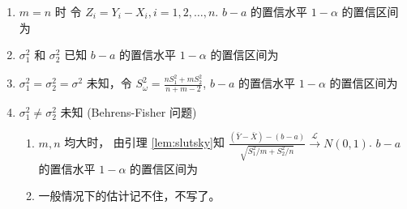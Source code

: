 \begin{proposition}\label{prop:均值差$b-a$的置信区间}
    \begin{enumerate}
    \item $m=n$ 时
    令 $Z_i = Y_i - X_i, i = 1,2, \dots, n$. 
    $b-a$ 的置信水平 $1-\alpha$ 的置信区间为 
    \begin{equation}
        [\bar{Z} - \frac{S_Z}{\sqrt{n}} t_{n-1}(\alpha/2), \bar{Z} + \frac{S_Z}{\sqrt{n}} t_{n-1}(\alpha/2)]
    \end{equation}

    \item $\sigma_1^2$ 和 $\sigma_2^2$ 已知
    $b-a$ 的置信水平 $1-\alpha$ 的置信区间为
    \begin{equation}
        [\bar{X}-\bar{Y} - \sqrt{\sigma_1^2/n + \sigma_2^2/m} u_{\alpha/2}, \bar{X}-\bar{Y} + \sqrt{\sigma_1^2/n + \sigma_2^2/m} u_{\alpha/2}]
    \end{equation}

    \item $\sigma_1^2 = \sigma_2^2 = \sigma^2$ 未知，令 $S_{\omega}^2 = \frac{nS_1^2 + mS_2^2}{n+m-2}$, 
    $b-a$ 的置信水平 $1-\alpha$ 的置信区间为
    \begin{equation}
        [\bar{Y}-\bar{X} - S_{\omega}\sqrt{1/n+1/m} t_{n+m-2}(\alpha/2), \bar{Y}-\bar{X} + S_{\omega}\sqrt{1/n+1/m} t_{n+m-2}(\alpha/2)]
    \end{equation}

    \item $\sigma_1^2 \ne \sigma_2^2$ 未知 (Behrens-Fisher 问题)
    \begin{enumerate}
        \item $m,n$ 均大时，
    由引理 \ref{lem:slutsky}知
    $\frac{(\bar{Y}-\bar{X})-(b-a)}{\sqrt{S_1^2/m + S_2^2/n}} \xrightarrow{\mathscr{L}} N(0,1)$.
    $b-a$ 的置信水平 $1-\alpha$ 的置信区间为
    \begin{equation}
        [\bar{X}-\bar{Y} - \sqrt{S_1^2/m + S_2^2/n} u_{\alpha/2}, \bar{X}-\bar{Y} + \sqrt{S_1^2/m + S_2^2/n} u_{\alpha/2}]
    \end{equation}
        \item 一般情况下的估计记不住，不写了。
    \end{enumerate}
\end{enumerate}
\end{proposition}

